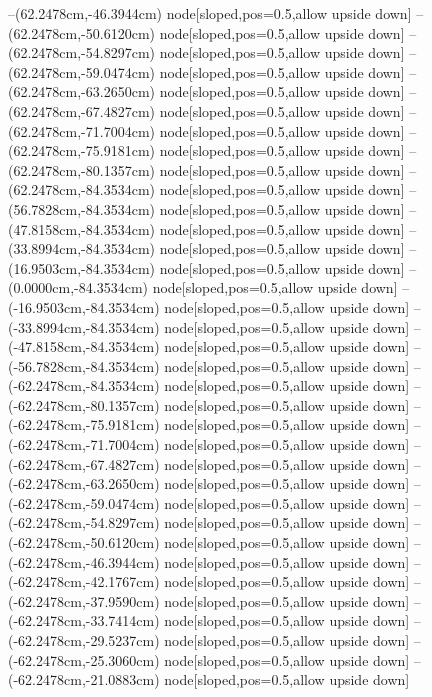 --(62.2478cm,-46.3944cm) node[sloped,pos=0.5,allow upside down]{\ArrowIn}
--(62.2478cm,-50.6120cm) node[sloped,pos=0.5,allow upside down]{\ArrowIn}
--(62.2478cm,-54.8297cm) node[sloped,pos=0.5,allow upside down]{\ArrowIn}
--(62.2478cm,-59.0474cm) node[sloped,pos=0.5,allow upside down]{\ArrowIn}
--(62.2478cm,-63.2650cm) node[sloped,pos=0.5,allow upside down]{\ArrowIn}
--(62.2478cm,-67.4827cm) node[sloped,pos=0.5,allow upside down]{\ArrowIn}
--(62.2478cm,-71.7004cm) node[sloped,pos=0.5,allow upside down]{\ArrowIn}
--(62.2478cm,-75.9181cm) node[sloped,pos=0.5,allow upside down]{\ArrowIn}
--(62.2478cm,-80.1357cm) node[sloped,pos=0.5,allow upside down]{\ArrowIn}
--(62.2478cm,-84.3534cm) node[sloped,pos=0.5,allow upside down]{\ArrowIn}
--(56.7828cm,-84.3534cm) node[sloped,pos=0.5,allow upside down]{\ArrowIn}
--(47.8158cm,-84.3534cm) node[sloped,pos=0.5,allow upside down]{\ArrowIn}
--(33.8994cm,-84.3534cm) node[sloped,pos=0.5,allow upside down]{\ArrowIn}
--(16.9503cm,-84.3534cm) node[sloped,pos=0.5,allow upside down]{\ArrowIn}
--(0.0000cm,-84.3534cm) node[sloped,pos=0.5,allow upside down]{\ArrowIn}
--(-16.9503cm,-84.3534cm) node[sloped,pos=0.5,allow upside down]{\ArrowIn}
--(-33.8994cm,-84.3534cm) node[sloped,pos=0.5,allow upside down]{\ArrowIn}
--(-47.8158cm,-84.3534cm) node[sloped,pos=0.5,allow upside down]{\ArrowIn}
--(-56.7828cm,-84.3534cm) node[sloped,pos=0.5,allow upside down]{\ArrowIn}
--(-62.2478cm,-84.3534cm) node[sloped,pos=0.5,allow upside down]{\ArrowIn}
--(-62.2478cm,-80.1357cm) node[sloped,pos=0.5,allow upside down]{\ArrowIn}
--(-62.2478cm,-75.9181cm) node[sloped,pos=0.5,allow upside down]{\ArrowIn}
--(-62.2478cm,-71.7004cm) node[sloped,pos=0.5,allow upside down]{\ArrowIn}
--(-62.2478cm,-67.4827cm) node[sloped,pos=0.5,allow upside down]{\ArrowIn}
--(-62.2478cm,-63.2650cm) node[sloped,pos=0.5,allow upside down]{\ArrowIn}
--(-62.2478cm,-59.0474cm) node[sloped,pos=0.5,allow upside down]{\ArrowIn}
--(-62.2478cm,-54.8297cm) node[sloped,pos=0.5,allow upside down]{\ArrowIn}
--(-62.2478cm,-50.6120cm) node[sloped,pos=0.5,allow upside down]{\ArrowIn}
--(-62.2478cm,-46.3944cm) node[sloped,pos=0.5,allow upside down]{\ArrowIn}
--(-62.2478cm,-42.1767cm) node[sloped,pos=0.5,allow upside down]{\ArrowIn}
--(-62.2478cm,-37.9590cm) node[sloped,pos=0.5,allow upside down]{\ArrowIn}
--(-62.2478cm,-33.7414cm) node[sloped,pos=0.5,allow upside down]{\ArrowIn}
--(-62.2478cm,-29.5237cm) node[sloped,pos=0.5,allow upside down]{\ArrowIn}
--(-62.2478cm,-25.3060cm) node[sloped,pos=0.5,allow upside down]{\ArrowIn}
--(-62.2478cm,-21.0883cm) node[sloped,pos=0.5,allow upside down]{\ArrowIn}
